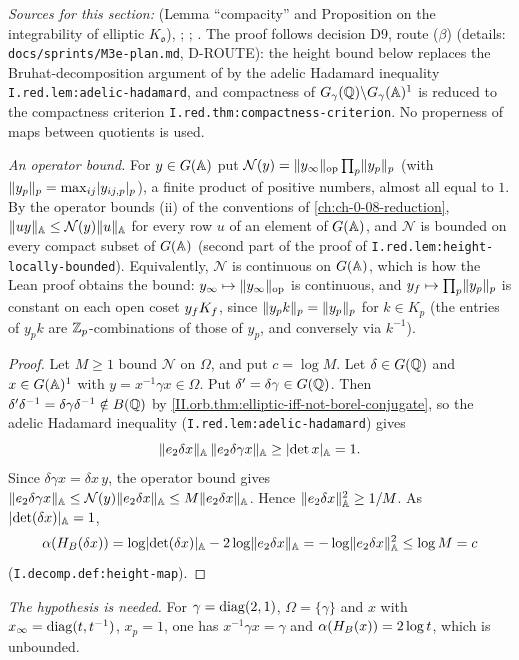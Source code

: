 \noindent\emph{Sources for this section:} \cite[Lecture II §2]{Gel} (Lemma ``compacity'' and Proposition on the integrability of
elliptic $K_{\mathfrak o}$), \cite[p.~362]{A-R1}; \cite[§§10--11]{AIntro}; \cite[§16]{JL}. The proof follows decision D9, route ($\beta$)
(details: \texttt{docs/sprints/M3e-plan.md}, D-ROUTE): the height bound below replaces the Bruhat-decomposition argument of
\cite[p.~362]{A-R1} by the adelic Hadamard inequality \texttt{I.red.lem:adelic-hadamard}, and compactness of
$G_\gamma(\mathbb{Q})\backslash G_\gamma(\mathbb{A})^1$ is reduced to the compactness criterion \texttt{I.red.thm:compactness-criterion}. No properness of maps
between quotients is used.

\emph{An operator bound.} For $y\in G(\mathbb{A})$ put $\mathcal N(y)=\lVert y_\infty\rVert_{\mathrm{op}}\prod_p\lVert y_p\rVert_p$ (with $\lVert y_p\rVert_p=\max_{ij}\lvert y_{ij,p}\rvert_p$),
a finite product of positive numbers, almost all equal to $1$. By the operator bounds (ii) of the conventions of \cref{ch:ch-0-08-reduction},
$\lVert uy\rVert_{\mathbb{A}}\le\mathcal N(y)\lVert u\rVert_{\mathbb{A}}$ for every row $u$ of an element of $G(\mathbb{A})$, and $\mathcal N$ is bounded on every compact subset of $G(\mathbb{A})$
(second part of the proof of \texttt{I.red.lem:height-locally-bounded}). Equivalently, $\mathcal N$ is continuous on $G(\mathbb{A})$, which is how the Lean
proof obtains the bound: $y_\infty\mapsto\lVert y_\infty\rVert_{\mathrm{op}}$ is continuous, and $y_f\mapsto\prod_p\lVert y_p\rVert_p$ is constant on each open coset
$y_fK_f$, since $\lVert y_pk\rVert_p=\lVert y_p\rVert_p$ for $k\in K_p$ (the entries of $y_pk$ are $\mathbb{Z}_p$-combinations of those of $y_p$, and conversely via $k^{-1}$).

\begin{lemma}
\end{lemma}
\begin{proof}
Let $M\ge1$ bound $\mathcal N$ on $\Omega$, and put $c=\log M$. Let $\delta\in G(\mathbb{Q})$ and $x\in G(\mathbb{A})^1$ with $y=x^{-1}\gamma x\in\Omega$. Put $\delta'=\delta\gamma\in G(\mathbb{Q})$.
Then $\delta'\delta^{-1}=\delta\gamma\delta^{-1}\notin B(\mathbb{Q})$ by \cref{II.orb.thm:elliptic-iff-not-borel-conjugate}, so the adelic Hadamard inequality
(\texttt{I.red.lem:adelic-hadamard}) gives
\[
  \lVert e_2\delta x\rVert_{\mathbb{A}}\,\lVert e_2\delta\gamma x\rVert_{\mathbb{A}}\ge\lvert\det x\rvert_{\mathbb{A}}=1 .
\]
Since $\delta\gamma x=\delta x\,y$, the operator bound gives $\lVert e_2\delta\gamma x\rVert_{\mathbb{A}}\le\mathcal N(y)\lVert e_2\delta x\rVert_{\mathbb{A}}\le M\lVert e_2\delta x\rVert_{\mathbb{A}}$. Hence
$\lVert e_2\delta x\rVert_{\mathbb{A}}^2\ge1/M$. As $\lvert\det(\delta x)\rvert_{\mathbb{A}}=1$,
\[
  \alpha(H_B(\delta x))=\log\lvert\det(\delta x)\rvert_{\mathbb{A}}-2\log\lVert e_2\delta x\rVert_{\mathbb{A}}=-\log\lVert e_2\delta x\rVert_{\mathbb{A}}^2\le\log M=c
\]
(\texttt{I.decomp.def:height-map}).
\end{proof}
\noindent \emph{The hypothesis is needed.} For $\gamma=\operatorname{diag}(2,1)$, $\Omega=\{\gamma\}$ and $x$ with $x_\infty=\operatorname{diag}(t,t^{-1})$, $x_p=1$, one has
$x^{-1}\gamma x=\gamma$ and $\alpha(H_B(x))=2\log t$, which is unbounded.

